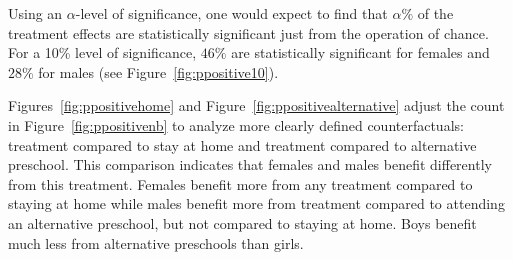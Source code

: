 Using an $\alpha$-level of significance, one would expect to find that $\alpha\%$ of the treatment effects are statistically significant just from the operation of chance. For a 10\% level of significance, $46\%$ are statistically significant for females and $28\%$ for males (see Figure~\ref{fig:ppositive10}).

Figures~\ref{fig:ppositivehome} and Figure~\ref{fig:ppositivealternative} adjust the count in Figure~\ref{fig:ppositivenb} to analyze more clearly defined counterfactuals: treatment compared to stay at home and treatment compared to alternative preschool. This comparison indicates that females and males benefit differently from this treatment. Females benefit more from any treatment compared to staying at home while males benefit more from treatment compared to attending an alternative preschool, but not compared to staying at home. Boys benefit much less from alternative preschools than girls.


